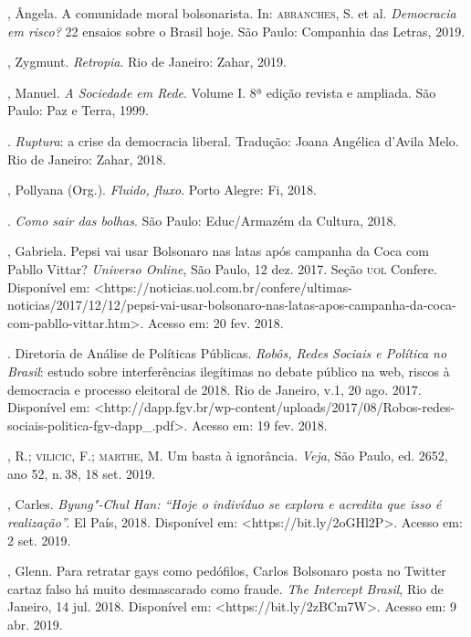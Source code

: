 \begin{bibliohedra}
, Ângela. A comunidade moral bolsonarista. In: \textsc{abranches}, S. et
al. \emph{Democracia em risco?} 22 ensaios sobre o Brasil hoje. São
Paulo: Companhia das Letras, 2019.

, Zygmunt. \emph{Retropia}. Rio de Janeiro: Zahar, 2019.

, Manuel. \emph{A Sociedade em Rede}. Volume I. 8ª edição
revista e ampliada. São Paulo: Paz e Terra, 1999.

\titidem. \emph{Ruptura}: a crise da democracia liberal.
Tradução: Joana Angélica d'Avila Melo. Rio de Janeiro: Zahar, 2018.

, Pollyana (Org.). \emph{Fluido, fluxo}. Porto Alegre: Fi, 2018.

\titidem. \emph{Como sair das bolhas}. São Paulo: Educ/Armazém
da Cultura, 2018.

, Gabriela. Pepsi vai usar Bolsonaro nas latas após campanha da
Coca com Pabllo Vittar? \emph{Universo Online}, São Paulo, 12 dez. 2017.
Seção \textsc{uol} Confere. Disponível em:
\textless{}https://noticias.uol.com.br/confere/ultimas-noticias/2017/12/12/pepsi-vai-usar-bolsonaro-nas-latas-apos-campanha-da-coca-com-pabllo-vittar.htm\textgreater{}.
Acesso em: 20 fev. 2018.

. Diretoria de Análise de Políticas Públicas.
\emph{Robôs, Redes Sociais e Política no Brasil}: estudo sobre
interferências ilegítimas no debate público na web, riscos à democracia
e processo eleitoral de 2018. Rio de Janeiro, v.1, 20 ago. 2017.
Disponível em:
\textless{}http://dapp.fgv.br/wp-content/uploads/2017/08/Robos-redes-sociais-politica-fgv-dapp\_.pdf\textgreater{}.
Acesso em: 19 fev. 2018.

, R.; \textsc{vilicic}, F.; \textsc{marthe}, M. Um basta à ignorância. \emph{Veja},
São Paulo, ed. 2652, ano 52, n.\,38, 18 set. 2019.

, Carles. \emph{Byung"-Chul Han: ``Hoje o indivíduo se explora e
acredita que isso é realização''.} El País, 2018. Disponível em:
\textless{}https://bit.ly/2oGHl2P\textgreater{}.
Acesso em: 2 set. 2019.

, Glenn. Para retratar gays como pedófilos, Carlos Bolsonaro
posta no Twitter cartaz falso há muito desmascarado como fraude.
\emph{The Intercept Brasil}, Rio de Janeiro, 14 jul. 2018. Disponível
em:
\textless{}https://bit.ly/2zBCm7W\textgreater{}.
Acesso em: 9 abr. 2019.


\end{bibliohedra}
